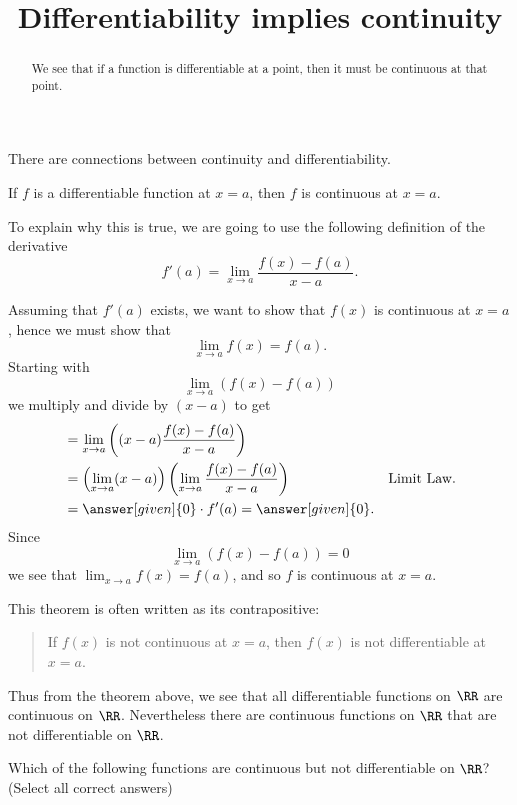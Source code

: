 \documentclass{ximera}
\title[Dig-In:]{Differentiability implies continuity}
\begin{document}
\begin{abstract}
We see that if a function is differentiable at a point, then it must
be continuous at that point.
\end{abstract}
\maketitle

There are connections between continuity and differentiability.

\begin{theorem}
If $f$ is a differentiable function at $x = a$, then $f$ is continuous
at $x=a$.
\begin{explanation}
To explain why this is true, we are going to use the following
definition of the derivative
\[
f'(a) = \lim_{x\to a} \frac{f(x)-f(a)}{x-a}.
\]

  Assuming that $f'(a)$ exists, we want to show that $f(x)$ is
continuous at $x=a$, hence we must show that
\[
\lim_{x\to a} f(x) = f(a).
\]
Starting with
\[
\lim_{x\to a} \left(f(x) - f(a)\right)
\]
we multiply and divide by $(x-a)$ to get
\begin{align*}
  &= \lim_{x\to a} \left((x-a)\frac{f(x) - f(a)}{x-a}\right) \\
  &= \left(\lim_{x\to a} (x-a) \right) \left(\lim_{x\to a}\frac{f(x) - f(a)}{x-a}\right) &\text{Limit Law.} \\
  &= \answer[given]{0}\cdot f'(a) = \answer[given]{0}.
\end{align*}
Since 
\[
\lim_{x\to a}\left(f(x) - f(a)\right) = 0 
\]
we see that $\lim_{x\to a} f(x) = f(a)$, and so $f$ is continuous at
$x=a$.
\end{explanation}
\end{theorem}

This theorem is often written as its contrapositive:
\begin{quote}
If $f(x)$ is not continuous at $x=a$, then $f(x)$ is not
differentiable at $x=a$.
\end{quote}


Thus from the theorem above, we see that all differentiable functions
on $\RR$ are continuous on $\RR$. Nevertheless there are continuous
functions on $\RR$ that are not differentiable on $\RR$.

\begin{question}
  Which of the following functions are continuous but not
  differentiable on $\RR$? (Select all correct answers)
  \begin{selectAll}
  \end{selectAll}
\end{question}
\end{document}
